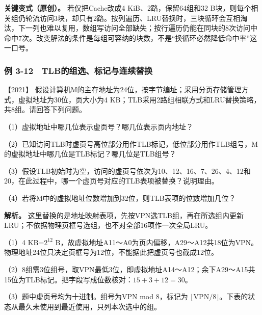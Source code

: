 \textbf{关键变式（原创）。} 若仅把Cache改成4 KiB、2路，保留64组和32 B块，则每个相关组仍轮流访问3块，却只有2路。按列遍历、LRU替换时，三块循环会互相淘汰，下一列也难以复用，数组写访问全部缺失；按行遍历仍能在同块的8次访问中命中7次。改变解法的条件是每组可容纳的块数，不是``换循环必然降低命中率''这一口号。

\subsubsection{例 3-12　TLB的组选、标记与连续替换}\label{co-ex3-12}

\noindent{}【2021】 假设计算机M的主存地址为24位，按字节编址；采用分页存储管理方式，虚拟地址为30位，页大小为4 KB；TLB采用2路组相联方式和LRU替换策略，共8组。请回答下列问题。

（1）虚拟地址中哪几位表示虚页号？哪几位表示页内地址？

（2）已知访问TLB时虚页号高位部分用作TLB标记，低位部分用作TLB组号，M的虚拟地址中哪几位是TLB标记？哪几位是TLB组号？

（3）假设TLB初始时为空，访问的虚页号依次为10、12、16、7、26、4、12和20，在此过程中，哪一个虚页号对应的TLB表项被替换？说明理由。

（4）若将M中的虚拟地址位数增加到32位，则TLB表项的位数增加几位？


\textbf{解析。} 这里替换的是地址映射表项，先按VPN选TLB组，再在所选组内更新LRU；不依据物理页框号选组，也不对全部16项作一次全局LRU。

（1）4 KB=\(2^{12}\) B，故虚拟地址A11～A0为页内偏移，A29～A12共18位为VPN。物理地址24位只决定页框号为12位，不能据此把虚页号也截成12位。

（2）8组需3位组号，取VPN最低3位，即虚拟地址A14～A12；余下A29～A15共15位为TLB标记。把字段写成位数核对：\(15+3+12=30\)。

（3）题中虚页号均为十进制。组号为VPN mod 8，标记为 \(\lfloor\mathrm{VPN}/8\rfloor\)。下表的状态从最久未使用到最近使用，只列本次选中的组。

